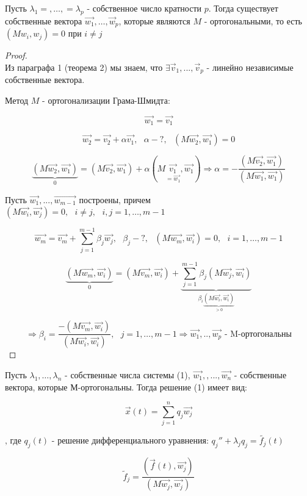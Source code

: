 \documentclass[12pt, a4paper]{report}
\begin{document}
\begin{theorem}
    Пусть \( \lambda_1=, \ldots, =\lambda_p \) - собственное число кратности \( p \). Тогда существует собственные вектора \( \vec{w_1} , \ldots,\vec{w } _{p}   \), которые являются \( M  \)   - ортогональными, то есть \( (M w_i, w_j ) = 0  \) при \( i \neq j \) 
\end{theorem}


\begin{proof}

\[  \] 
    Из параграфа 1 (теорема 2) мы знаем, что \( \exists  \vec{v } _1 ,..., \vec{v } _p  \) - линейно независимые собственные вектора. 
    
    Метод \( M \) - ортогонализации Грама-Шмидта: 

    \[\vec{w_1 } = \vec{v_1 }    \] 

    \[ \vec{w_2 } = \vec{v_2 } + \alpha \vec{v_1 } , \text{ }  \alpha - ? , \text{  } ( M \vec{w_2 }, \vec{w_1 }  ) = 0    \] 

    \[ \underbrace{(M \vec{w_2 }, \vec{w_1}  ) }_{0}= (M\vec{v_2 }, \vec{w_1 }  ) + \alpha (M \underset{=\vec{w_1}}{\vec{v_1 }}, \vec{w_1}   )  \Rightarrow \alpha =- \frac{ (M \vec{v_2 }, \vec{w_1}  )}{(M \vec{w_1 }, \vec{w_1}  )} \] 

    Пусть \( \vec{w_1 },..., \vec{w_{m-1} }    \) построены, причем \( (M \vec{w_i } , \vec{w_j}  )= 0 ,\text{ } i \neq j , \text{ } i,j= 1, \ldots, m-1 \) 

    \[ \vec{w_m } = \vec{v_m }+ \sum_{j =1}^{m -1 }  \beta_j \vec{w_j } , \text{ } \beta_j -? , \text{ } (M \vec{w_m }, \vec{w_i}  ) = 0, \text{ } i=1, \ldots, m-1    \]
    
    \[ \underbrace{(M \vec{w_m } , \vec{w_i }  )}_{0} = (M \vec{v_m }, \vec{w_i} ) +\underbrace{ \sum_{j =1}^{m-1 } \beta_j (M\vec{w_j }, \vec{w_i}  )}_{\beta_i \underbrace{(M\vec{w_i }, \vec{w_i }  )}_{>0}}  \] 

    \[ \Rightarrow \beta_i = \frac{ - (M \vec{v_m }, \vec{w_i }  )}{(M \vec{w_i }, \vec{w_i}  )}  ,\text{ }  j= 1, \ldots, m-1  \Rightarrow \vec{w_1 },.., \vec{w_p} \text{ - M-ортогональны}   \] 
\end{proof}

\begin{theorem}
    Пусть \( \lambda_1, \ldots, \lambda_n \)  - собственные числа системы (1), \( \vec{w_1 }, ,..., \vec{w_n}   \) - собственные вектора, которые М-ортогональны. Тогда решение (1) имеет вид: 

    \[ \vec{x } (t ) = \sum_{j =1}^{n } q_j \vec{w_j }  \] 

    \(\text{, где }  q_j (t ) \text{ - решение дифференциального уравнения: }  q_j '' + \lambda_j q_j = \tilde{f_j }(t) \) 

    \[ \tilde{f }_j = \frac{(\vec{f } (t ), \vec{w_j} )}{(M \vec{w_j} , \vec{w_j} )} \] 
\end{theorem}
\end{document}
